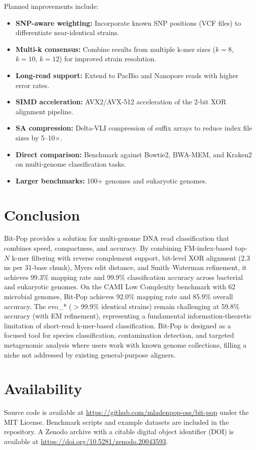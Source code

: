 \documentclass{article}
\begin{document}
Planned improvements include:
\begin{itemize}
    \item \textbf{SNP-aware weighting:} Incorporate known SNP positions (VCF files) to differentiate near-identical strains.
    \item \textbf{Multi-k consensus:} Combine results from multiple k-mer sizes ($k=8$, $k=10$, $k=12$) for improved strain resolution.
    \item \textbf{Long-read support:} Extend to PacBio and Nanopore reads with higher error rates.
    \item \textbf{SIMD acceleration:} AVX2/AVX-512 acceleration of the 2-bit XOR alignment pipeline.
    \item \textbf{SA compression:} Delta-VLI compression of suffix arrays to reduce index file sizes by 5--10$\times$.
    \item \textbf{Direct comparison:} Benchmark against Bowtie2, BWA-MEM, and Kraken2 on multi-genome classification tasks.
    \item \textbf{Larger benchmarks:} 100+ genomes and eukaryotic genomes.
\end{itemize}

\section{Conclusion}

Bit-Pop provides a solution for multi-genome DNA read classification that combines speed, compactness, and accuracy. By combining FM-index-based top-$N$ k-mer filtering with reverse complement support, bit-level XOR alignment (2.3 ns per 31-base chunk), Myers edit distance, and Smith--Waterman refinement, it achieves 99.3\% mapping rate and 99.9\% classification accuracy across bacterial and eukaryotic genomes. On the CAMI Low Complexity benchmark with 62 microbial genomes, Bit-Pop achieves 92.0\% mapping rate and 85.9\% overall accuracy. The evo\_* ($>$99.9\% identical strains) remain challenging at 59.8\% accuracy (with EM refinement), representing a fundamental information-theoretic limitation of short-read k-mer-based classification. Bit-Pop is designed as a focused tool for species classification, contamination detection, and targeted metagenomic analysis where users work with known genome collections, filling a niche not addressed by existing general-purpose aligners.

\section*{Availability}

Source code is available at \url{https://github.com/mladenpop-oss/bit-pop} under the MIT License. Benchmark scripts and example datasets are included in the repository. A Zenodo archive with a citable digital object identifier (DOI) is available at \url{https://doi.org/10.5281/zenodo.20043593}.



\end{document}
